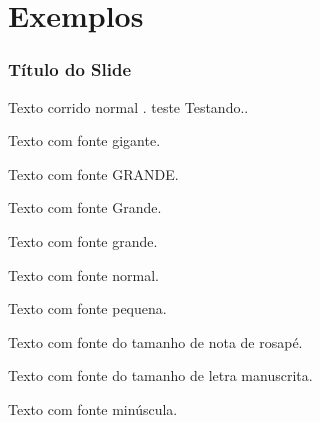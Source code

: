 \section{Exemplos}


\begin{frame}

    \frametitle{Título do Slide}

    Texto corrido normal .
    teste
    Testando..
    
    \begin{huge}
        Texto com fonte gigante.
    \end{huge}
    
    \begin{LARGE}
        Texto com fonte GRANDE.
    \end{LARGE}
        
    \begin{Large}
        Texto com fonte Grande.
    \end{Large}
    
    \begin{large}
        Texto com fonte grande.
    \end{large}
    
    \begin{normalsize}
        Texto com fonte normal.
    \end{normalsize}
        
    \begin{small}
        Texto com fonte pequena.
    \end{small}
        
    \begin{footnotesize}
        Texto com fonte do tamanho de nota de rosapé.
    \end{footnotesize}
    
    \begin{scriptsize}
        Texto com fonte do tamanho de letra manuscrita.
    \end{scriptsize}
        
    \begin{tiny}
        Texto com fonte minúscula.
    \end{tiny}        

\end{frame}


